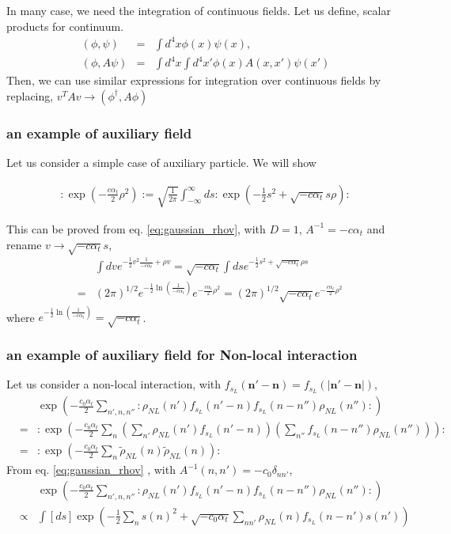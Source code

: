 \documentclass[10pt]{book}
\def\bm{\boldsymbol}
\newcommand{\bea}{\begin{eqnarray}}
\newcommand{\eea}{\end{eqnarray}}
\newcommand{\no}{\nonumber \\}
\def\vn{{\bm n}}
\begin{document}
In many case, we need the integration of continuous fields. Let us define, 
scalar products for continuum.
\bea 
(\phi,\psi)&=& \int d^4 x \phi(x)\psi(x),\no 
(\phi,A\psi)&=& \int d^4 x \int d^4 x' \phi(x) A(x,x')\psi(x')
\eea 
Then, we can use similar expressions for integration over continuous fields by replacing,
$v^T A v \to (\phi^\dagger,A\phi)$





\subsubsection{an example of auxiliary field}
Let us consider a simple case of auxiliary particle. 
We will show 
\begin{framed}
\bea
:\exp\left(-\frac{c\alpha_t}{2}\rho^2\right):=\sqrt{\frac{1}{2\pi}}\int_{-\infty}^\infty ds : \exp\left(-\frac{1}{2}s^2+\sqrt{-c\alpha_t} s\rho\right):
\eea 
\end{framed} 
This can be proved from eq. \eqref{eq:gaussian_rhov}, with $D=1$, $A^{-1}=-c\alpha_t$
and rename $v\to \sqrt{-c\alpha_t} s$,
\bea 
& &\int dv e^{-\frac{1}{2}v^2\frac{1}{-c\alpha_t}+\rho v}=
    \sqrt{-c\alpha_t}\int ds e^{-\frac{1}{2}s^2+\sqrt{-c\alpha_t}\rho s} \no 
&=&(2\pi)^{1/2}e^{-\frac{1}{2}\ln(\frac{1}{-c\alpha_t})} e^{-\frac{c\alpha_t}{2}\rho^2}
  =(2\pi)^{1/2}\sqrt{-c\alpha_t}e^{-\frac{c\alpha_t}{2}\rho^2}
\eea 
where $e^{-\frac{1}{2}\ln(\frac{1}{-c\alpha_t})}=\sqrt{-c\alpha_t}$. 


\subsubsection{an example of auxiliary field for Non-local interaction} 

Let us consider a non-local interaction, with  $f_{s_L}(\vn'-\vn)=f_{s_L}(|\vn'-\vn|)  $,
\bea 
& &\exp(-\frac{c_0\alpha_t}{2}\sum_{n',n,n''} :\rho_{NL}(n')f_{s_L}(n'-n)f_{s_L}(n-n'')\rho_{NL}(n''):) \no 
&=&:\exp(- \frac{c_0\alpha_t}{2}\sum_{n}\left(\sum_{n'} \rho_{NL}(n')f_{s_L}(n'-n)\right)\left(\sum_{n''}f_{s_L}(n-n'')\rho_{NL}(n'')\right) ): \no 
&=& :\exp(-\frac{c_0\alpha_t}{2}\sum_{n}\tilde{\rho}_{NL}(n)\tilde{\rho}_{NL}(n) ):
\eea 
From eq. \eqref{eq:gaussian_rhov} , with $A^{-1}(n,n')=-c_0\delta_{nn'}$, 
\bea 
& &\exp(-\frac{c_0\alpha_t}{2}\sum_{n',n,n''} :\rho_{NL}(n')f_{s_L}(n'-n)f_{s_L}(n-n'')\rho_{NL}(n''):) \no 
&\propto&\int [d s] \exp\left(-\frac{1}{2}\sum_{n} s(n)^2+\sqrt{-c_0\alpha_t}\sum_{n n'}\rho_{NL}(n)f_{s_L}(n-n')s(n')\right)
\eea 
\end{document}
